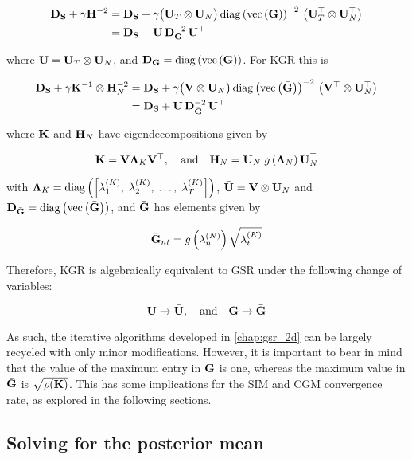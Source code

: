 \begin{align*}
    \mathbf{D}_{\mathbf{S}} + \gamma \mathbf{H}^{-2} &= \mathbf{D}_{\mathbf{S}} + \gamma \big(\mathbf{U}_T \otimes \mathbf{U}_N \big) \, \text{\textup{diag}}\left(\text{\textup{vec}}\left(\mathbf{G}\right)\right)^{-2} \, \big(\mathbf{U}_T^\top \otimes \mathbf{U}_N^\top \big) \\
    &= \mathbf{D}_{\mathbf{S}} + \mathbf{U} \, \mathbf{D}_{\mathbf{G}}^{-2} \, \mathbf{U}^\top
\end{align*}

where $\mathbf{U} = \mathbf{U}_T \otimes \mathbf{U}_N $, and $\mathbf{D}_{\mathbf{G}} = \text{\textup{diag}}\left(\text{\textup{vec}}\left(\mathbf{G}\right)\right)$. For KGR this is

\begin{align*}
    \mathbf{D}_{\mathbf{S}} + \gamma \mathbf{K}^{-1} \otimes \mathbf{H}_N^{-2} &= \mathbf{D}_{\mathbf{S}} + \gamma \big(\mathbf{V} \otimes \mathbf{U}_N \big) \, \text{\textup{diag}}\left(\text{\textup{vec}}\left(\bar{\mathbf{G}}\right)\right)^{-2} \, \big(\mathbf{V}^\top \otimes \mathbf{U}_N^\top \big) \\
    &= \mathbf{D}_{\mathbf{S}} + \bar{\mathbf{U}} \, \mathbf{D}_{\bar{\mathbf{G}}}^{-2} \, \bar{\mathbf{U}}^\top
\end{align*}

where $\mathbf{K}$ and $\mathbf{H}_N$ have eigendecompositions given by 

\begin{equation}
    \mathbf{K} = \mathbf{V} \mathbf{\Lambda}_K \mathbf{V}^\top, \quad \text{and} \quad \mathbf{H}_N = \mathbf{U}_N \; g\left(\mathbf{\Lambda}_N\right)  \mathbf{U}_N^\top
\end{equation}

with $\mathbf{\Lambda}_K = \text{\textup{diag}}\left(\left[\lambda^{(K)}_1, \; \lambda^{(K)}_2, \; \dots, \;\lambda^{(K)}_T \right]\right)$, $\bar{\mathbf{U}} = \mathbf{V} \otimes \mathbf{U}_N$ and $\mathbf{D}_{\bar{\mathbf{G}}} = \text{\textup{diag}}\left(\text{\textup{vec}}\left(\bar{\mathbf{G}}\right)\right)$, and $\bar{\mathbf{G}}$ has elements given by

\begin{equation}
    \bar{\mathbf{G}}_{nt} = g\left(\lambda^{(N)}_n\right) \sqrt{\lambda^{(K)}_t} 
\end{equation}

Therefore, KGR is algebraically equivalent to GSR under the following change of variables:

$$
\mathbf{U} \rightarrow \bar{\mathbf{U}}, \quad \text{and} \quad \mathbf{G} \rightarrow \bar{\mathbf{G}}
$$

As such, the iterative algorithms developed in \cref{chap:gsr_2d} can be largely recycled with only minor modifications. However, it is important to bear in mind that the value of the maximum entry in $\mathbf{G}$ is one, whereas the maximum value in $\bar{\mathbf{G}}$ is $\sqrt{\rho(\mathbf{K})}$. This has some implications for the SIM and CGM convergence rate, as explored in the following sections. 
 

\subsection{Solving for the posterior mean}

